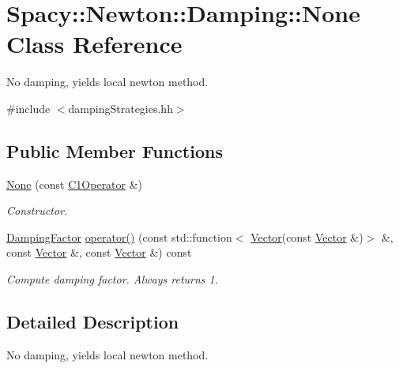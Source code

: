 \hypertarget{classSpacy_1_1Newton_1_1Damping_1_1None}{\section{Spacy\-:\-:Newton\-:\-:Damping\-:\-:None Class Reference}
\label{classSpacy_1_1Newton_1_1Damping_1_1None}
}


No damping, yields local newton method.  




{\ttfamily \#include $<$damping\-Strategies.\-hh$>$}

\subsection*{Public Member Functions}
\begin{DoxyCompactItemize}
\item 
\hypertarget{classSpacy_1_1Newton_1_1Damping_1_1None_ac153c7288c074756c6c3eeb8f91eddd4}{\hyperlink{classSpacy_1_1Newton_1_1Damping_1_1None_ac153c7288c074756c6c3eeb8f91eddd4}{None} (const \hyperlink{classSpacy_1_1C1Operator}{C1\-Operator} \&)}\label{classSpacy_1_1Newton_1_1Damping_1_1None_ac153c7288c074756c6c3eeb8f91eddd4}

\begin{DoxyCompactList}\small\item\em Constructor. \end{DoxyCompactList}\item 
\hyperlink{classSpacy_1_1DampingFactor}{Damping\-Factor} \hyperlink{classSpacy_1_1Newton_1_1Damping_1_1None_a79351f9d5d55c598f6723aa0e5ff8ff3}{operator()} (const std\-::function$<$ \hyperlink{classSpacy_1_1Vector}{Vector}(const \hyperlink{classSpacy_1_1Vector}{Vector} \&)$>$ \&, const \hyperlink{classSpacy_1_1Vector}{Vector} \&, const \hyperlink{classSpacy_1_1Vector}{Vector} \&) const 
\begin{DoxyCompactList}\small\item\em Compute damping factor. Always returns 1. \end{DoxyCompactList}\end{DoxyCompactItemize}


\subsection{Detailed Description}
No damping, yields local newton method. 

